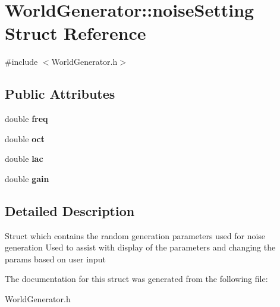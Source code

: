\hypertarget{structWorldGenerator_1_1noiseSetting}{}\section{World\+Generator\+:\+:noise\+Setting Struct Reference}
\label{structWorldGenerator_1_1noiseSetting}


{\ttfamily \#include $<$World\+Generator.\+h$>$}

\subsection*{Public Attributes}
\begin{DoxyCompactItemize}
\item 
\mbox{\label{structWorldGenerator_1_1noiseSetting_a3fd64f96fca6b401d2d3ca54d80267c0}} 
double {\bfseries freq}
\item 
\mbox{\label{structWorldGenerator_1_1noiseSetting_a0a72940e1bedc511f399ccc2c56ea54f}} 
double {\bfseries oct}
\item 
\mbox{\label{structWorldGenerator_1_1noiseSetting_a9edbdf74fbbc1676b1e48d32f60ad96c}} 
double {\bfseries lac}
\item 
\mbox{\label{structWorldGenerator_1_1noiseSetting_a0e62c3e9f8b58bedccae2fa9cb9c1f2c}} 
double {\bfseries gain}
\end{DoxyCompactItemize}


\subsection{Detailed Description}
Struct which contains the random generation parameters used for noise generation Used to assist with display of the parameters and changing the params based on user input 

The documentation for this struct was generated from the following file\+:\begin{DoxyCompactItemize}
\item 
World\+Generator.\+h\end{DoxyCompactItemize}
